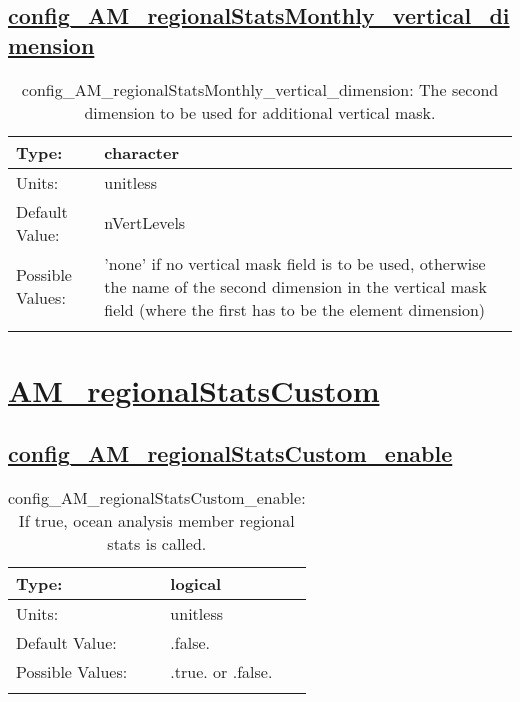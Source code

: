 \subsection[config\_AM\_regionalStatsMonthly\_vertical\_dimension]{\hyperref[sec:nm_tab_AM_regionalStatsMonthly]{config\_AM\_regionalStatsMonthly\_vertical\_dimension}}
\label{subsec:nm_sec_config_AM_regionalStatsMonthly_vertical_dimension}
\begin{center}
\begin{longtable}{| p{2.0in} || p{4.0in} |}
    \hline
    Type: & character \\
    \hline
    Units: & \si{unitless} \\
    \hline
    Default Value: & nVertLevels \\
    \hline
    Possible Values: & 'none' if no vertical mask field is to be used, otherwise the name of the second dimension in the vertical mask field (where the first has to be the element dimension) \\
    \hline
    \caption{config\_AM\_regionalStatsMonthly\_vertical\_dimension: The second dimension to be used for additional vertical mask.}
\end{longtable}
\end{center}
\section[AM\_regionalStatsCustom]{\hyperref[sec:nm_tab_AM_regionalStatsCustom]{AM\_regionalStatsCustom}}
\label{sec:nm_sec_AM_regionalStatsCustom}
\subsection[config\_AM\_regionalStatsCustom\_enable]{\hyperref[sec:nm_tab_AM_regionalStatsCustom]{config\_AM\_regionalStatsCustom\_enable}}
\label{subsec:nm_sec_config_AM_regionalStatsCustom_enable}
\begin{center}
\begin{longtable}{| p{2.0in} || p{4.0in} |}
    \hline
    Type: & logical \\
    \hline
    Units: & \si{unitless} \\
    \hline
    Default Value: & .false. \\
    \hline
    Possible Values: & .true. or .false. \\
    \hline
    \caption{config\_AM\_regionalStatsCustom\_enable: If true, ocean analysis member regional stats is called.}
\end{longtable}
\end{center}
